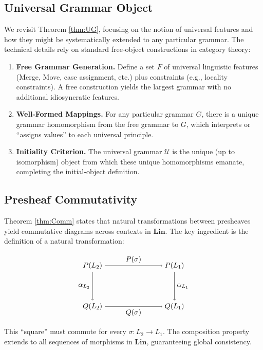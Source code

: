 \documentclass[12pt]{article}
\theoremstyle{plain}
\theoremstyle{definition}
\begin{document}
\subsection{Universal Grammar Object}
We revisit Theorem \ref{thm:UG}, focusing on the notion of universal features and how they might be systematically extended to any particular grammar. The technical details rely on standard free-object constructions in category theory:

\begin{enumerate}
    \item \textbf{Free Grammar Generation.} Define a set \(F\) of universal linguistic features (Merge, Move, case assignment, etc.) plus constraints (e.g., locality constraints). A free construction yields the largest grammar with no additional idiosyncratic features. 
    \item \textbf{Well-Formed Mappings.} For any particular grammar \(G\), there is a unique grammar homomorphism from the free grammar to \(G\), which interprets or “assigns values” to each universal principle.
    \item \textbf{Initiality Criterion.} The universal grammar \(\mathcal{U}\) is the unique (up to isomorphism) object from which these unique homomorphisms emanate, completing the initial-object definition.
\end{enumerate}

\subsection{Presheaf Commutativity}
Theorem \ref{thm:Comm} states that natural transformations between presheaves yield commutative diagrams across contexts in \(\mathbf{Lin}\). The key ingredient is the definition of a natural transformation:

\[
\begin{tikzpicture}[node distance=4em, auto]
  \node (L2) at (0,0) {$P(L_2)$};
  \node (L1) at (4,0) {$P(L_1)$};
  \node (L2Q) at (0,-2) {$Q(L_2)$};
  \node (L1Q) at (4,-2) {$Q(L_1)$};

  \draw[->] (L2) to node {$P(\sigma)$} (L1);
  \draw[->] (L2Q) to node [below] {$Q(\sigma)$} (L1Q);
  \draw[->] (L2) to node [left] {$\alpha_{L_2}$} (L2Q);
  \draw[->] (L1) to node [right] {$\alpha_{L_1}$} (L1Q);
\end{tikzpicture}
\]

This “square” must commute for every \(\sigma: L_2 \to L_1\). The composition property extends to all sequences of morphisms in \(\mathbf{Lin}\), guaranteeing global consistency.
\end{document}
